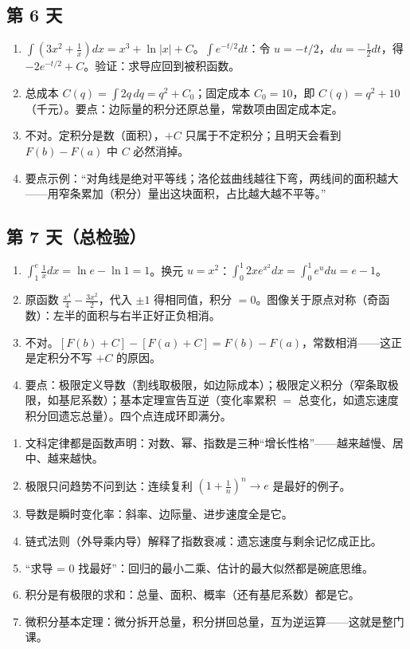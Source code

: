 \documentclass[UTF8,a4paper,11pt]{ctexart}
\begin{document}
\subsection*{第 6 天}
\begin{enumerate}
  \item $\int(3x^2+\tfrac1x)dx=x^3+\ln|x|+C$。$\int e^{-t/2}dt$：令 $u=-t/2$，$du=-\tfrac12dt$，得 $-2e^{-t/2}+C$。验证：求导应回到被积函数。
  \item 总成本 $C(q)=\int 2q\,dq=q^2+C_0$；固定成本 $C_0=10$，即 $C(q)=q^2+10$（千元）。要点：边际量的积分还原总量，常数项由固定成本定。
  \item 不对。定积分是数（面积），$+C$ 只属于不定积分；且明天会看到 $F(b)-F(a)$ 中 $C$ 必然消掉。
  \item 要点示例：“对角线是绝对平等线；洛伦兹曲线越往下弯，两线间的面积越大——用窄条累加（积分）量出这块面积，占比越大越不平等。”
\end{enumerate}

\subsection*{第 7 天（总检验）}
\begin{enumerate}
  \item $\int_1^{e}\tfrac1x dx=\ln e-\ln1=1$。换元 $u=x^2$：$\int_0^1 2xe^{x^2}dx=\int_0^1 e^{u}du=e-1$。
  \item 原函数 $\tfrac{x^4}{4}-\tfrac{3x^2}{2}$，代入 $\pm1$ 得相同值，积分 $=0$。图像关于原点对称（奇函数）：左半的面积与右半正好正负相消。
  \item 不对。$[F(b)+C]-[F(a)+C]=F(b)-F(a)$，常数相消——这正是定积分不写 $+C$ 的原因。
  \item 要点：极限定义导数（割线取极限，如边际成本）；极限定义积分（窄条取极限，如基尼系数）；基本定理宣告互逆（变化率累积 $=$ 总变化，如遗忘速度积分回遗忘总量）。四个点连成环即满分。
\end{enumerate}

\newpage

\begin{keyconcept}[学完你应该能讲给别人听的 7 句话]
\begin{enumerate}
  \item 文科定律都是函数声明：对数、幂、指数是三种“增长性格”——越来越慢、居中、越来越快。
  \item 极限只问趋势不问到达：连续复利 $(1+\tfrac1n)^n\to e$ 是最好的例子。
  \item 导数是瞬时变化率：斜率、边际量、进步速度全是它。
  \item 链式法则（外导乘内导）解释了指数衰减：遗忘速度与剩余记忆成正比。
  \item “求导 = 0 找最好”：回归的最小二乘、估计的最大似然都是碗底思维。
  \item 积分是有极限的求和：总量、面积、概率（还有基尼系数）都是它。
  \item 微积分基本定理：微分拆开总量，积分拼回总量，互为逆运算——这就是整门课。
\end{enumerate}
\end{keyconcept}
\end{document}
